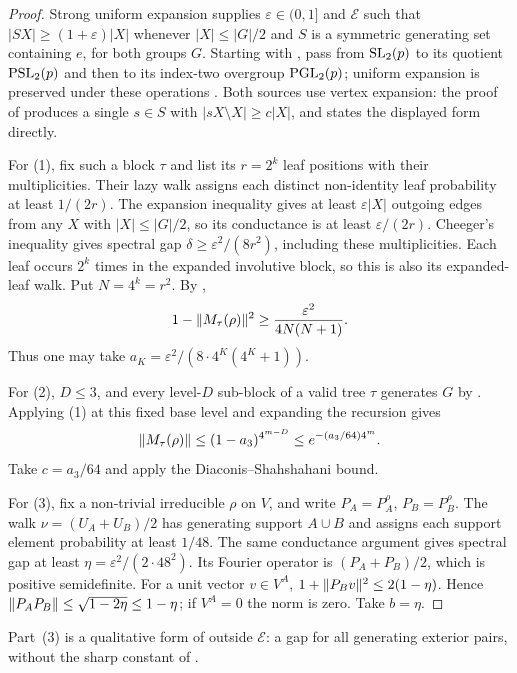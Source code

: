 \begin{proof}
Strong uniform expansion supplies $\varepsilon\in(0,1]$ and
$\mathcal E$ such that $|SX|\ge(1+\varepsilon)|X|$ whenever
$|X|\le|G|/2$ and $S$ is a symmetric generating set containing $e$,
for both groups $G$. Starting with
\cite[Corollary 1.1]{BreuillardGamburd2010}, pass from $\operatorname{SL}_2(p)$ to
its quotient $\operatorname{PSL}_2(p)$ and then to its index-two overgroup
$\operatorname{PGL}_2(p)$; uniform expansion is preserved under these operations
\cite[Lemma 3.9]{BeckerBreuillard2026}. Both sources use vertex
expansion: the proof of \cite[Corollary 1.1]{BreuillardGamburd2010}
produces a single $s\in S$ with $|sX\setminus X|\ge c|X|$, and
\cite[(1.1)]{BeckerBreuillard2026} states the displayed form directly.

For (1), fix such a block $\tau$ and list its $r=2^k$ leaf positions with their multiplicities.
Their lazy walk assigns each distinct non-identity leaf probability at
least $1/(2r)$. The expansion inequality gives at least
$\varepsilon|X|$ outgoing edges from any $X$ with $|X|\le|G|/2$,
so its conductance is at least $\varepsilon/(2r)$.
Cheeger's inequality gives spectral gap
$\delta\ge\varepsilon^2/(8r^2)$, including these multiplicities.
Each leaf occurs $2^k$ times in the expanded involutive block, so this
is also its expanded-leaf walk. Put $N=4^k=r^2$. By
,
\[
 1-\lVert M_\tau(\rho) \rVert^2
 \ge\frac{\varepsilon^2}{4N(N+1)}.
\]
Thus one may take $a_K=\varepsilon^2/(8\cdot4^K(4^K+1))$.

For (2), $D\le3$, and every level-$D$ sub-block of a valid tree $\tau$
generates $G$ by . Applying (1) at this fixed
base level and expanding the recursion gives
\[
 \lVert M_\tau(\rho) \rVert\le(1-a_3)^{4^{m-D}}
 \le e^{-(a_3/64)4^m}.
\]
Take $c=a_3/64$ and apply the Diaconis--Shahshahani bound.

For (3), fix a non-trivial irreducible $\rho$ on $V$, and write
$P_A=P_A^\rho$, $P_B=P_B^\rho$.
The walk $\nu=(U_A+U_B)/2$ has generating support
$A\cup B$ and assigns each support element probability at least $1/48$.
The same conductance argument gives spectral gap at least
$\eta=\varepsilon^2/(2\cdot48^2)$. Its Fourier operator is
$(P_A+P_B)/2$, which is positive semidefinite.
For a unit vector $v\in V^A$,
$1+\lVert P_Bv \rVert^2\le2(1-\eta)$.
Hence $\lVert P_AP_B \rVert\le\sqrt{1-2\eta}\le1-\eta$;
if $V^A=0$ the norm is zero. Take $b=\eta$.
\end{proof}

Part~(3) is a qualitative form of  outside
$\mathcal E$: a gap for all generating exterior pairs, without the sharp
constant of .

